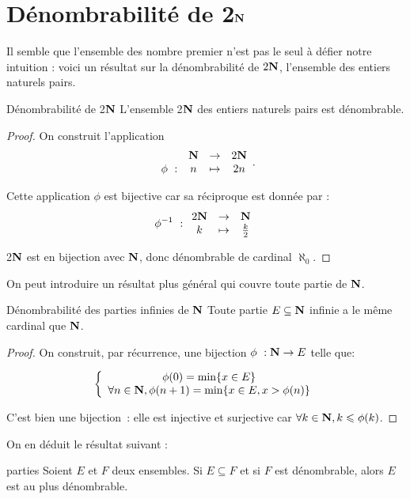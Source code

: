 \documentclass[a4paper,french,final]{memoir}
\begin{document}
\section{\texorpdfstring{Dénombrabilité de 2$\mathbf{N}$}{Dénombrabilité de 2N}}
\label{sec:denombrabilite_usuelle}
Il semble que l'ensemble des nombre premier n'est pas le seul à défier notre intuition :  voici un résultat sur la dénombrabilité de  $2\mathbf{N}$, l'ensemble des entiers naturels pairs.

\begin{theoremb}{Dénombrabilité de 2$\mathbf{N}$}{}
	L'ensemble 2$\mathbf{N}$ des entiers naturels pairs est dénombrable.
\end{theoremb}

\begin{proof}
	On construit l'application \[ \begin{array}{cccc}
	\ & \NN& \to& 2\NN \\
	\phi~: & n & \mapsto & 2n
	\end{array}.\]

  Cette application $\phi $ est bijective car sa réciproque est donnée par :
  \[ \phi^{-1}~: \begin{array}{ccc}
	2\NN & \to & \NN\\
	k & \mapsto & \frac{k}{2}
	\end{array}\]

	2$\mathbf{N}$ est en bijection avec $\mathbf{N}$, donc dénombrable de cardinal $\aleph_0$.
\end{proof}

On peut introduire un résultat plus général qui couvre toute partie de $\mathbf{N}$.

\begin{theoremb}{Dénombrabilité des parties infinies de $\mathbf{N}$}{}
	Toute partie $E \subseteq \mathbf{N}$ infinie a le même cardinal que $\mathbf{N}$.
\end{theoremb}

\begin{proof}
	On construit, par récurrence, une bijection $\phi~: \NN \to E$ telle que:

	\[\left\lbrace \begin{array}{c}
	\phi(0) = \min \{x \in E\} \\
	\forall n \in \NN, \phi(n+1) = \min \{x \in E, x > \phi(n) \}
	\end{array} \right.\]

	C'est bien une bijection~: elle est injective et surjective car $\forall k \in \NN, k \leq \phi(k)$.
\end{proof}
On en déduit le résultat suivant :
\begin{theoremb}{}{parties}
	Soient $E$ et $F$ deux ensembles.
	Si $E \subseteq F$ et si $F$ est dénombrable, alors $E$ est au plus dénombrable.
\end{theoremb}
\end{document}
